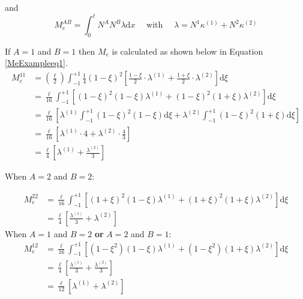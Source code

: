and
\begin{equation}
M_e^{AB} = \int_0^\ell N^A N^B \lambda \text{d}x \quad\text{ with }\quad \lambda = N^1 \kappa^{(1)} + N^2 \kappa^{(2)}
\end{equation}

If $A=1$ and $B=1$ then $M_e$ is calculated as shown below in Equation \ref{MeExampleeq1}.
\begin{equation} %
\begin{aligned}
M_e^{11} &= \left(\frac{\ell}{2}\right) \int_{-1}^{+1} \frac{1}{4} (1-\xi)^2\left[ \frac{1-\xi}{2} \cdot \lambda^{(1)} + \frac{1+\xi}{2} \cdot \lambda^{(2)} \right] \text{d} \xi \\
&= \frac{\ell}{16} \int_{-1}^{+1} \left[
	(1-\xi)^2(1-\xi) \lambda^{(1)}
	+ (1-\xi)^2(1+\xi) \lambda^{(2)}
\right] \text{d}\xi \\
&= \frac{\ell}{16} \left[
	\lambda^{(1)} \int_{-1}^{+1} (1-\xi)^2(1-\xi) \text{d}\xi
	+ \lambda^{(2)} \int_{-1}^{+1} (1-\xi)^2(1+\xi) \text{d}\xi
\right] \\
&= \frac{\ell}{16} \left[
	\lambda^{(1)} \cdot 4
	+ \lambda^{(2)} \cdot \frac{4}{3}
\right] \\
&= \frac{\ell}{4} \left[
	\lambda^{(1)} + \frac{\lambda^{(2)}}{3}
\right]
\end{aligned}
\end{equation}
 
 When $A=2$ and $B=2$:

\begin{equation}%
\begin{aligned}
M_e^{22} &= \frac{\ell}{16} \int_{-1}^{+1} \left[
	(1+\xi)^2(1-\xi)\lambda^{(1)} + (1+\xi)^2(1+\xi)\lambda^{(2)}
\right] \text{d}\xi \\
&= \frac{\ell}{4} \left[
	\frac{\lambda^{(1)}}{3}
	+ \lambda^{(2)}
\right]
\end{aligned}
\end{equation}
 When $A=1$ and $B=2$ \textbf{or} $A=2$ and $B=1$:
\begin{equation}%
\begin{aligned}
M_e^{12} &= \frac{\ell}{16} \int_{-1}^{+1} \left[
	(1-\xi^2)(1-\xi) \lambda^{(1)}
	+ (1-\xi^2)(1+\xi)\lambda^{(2)}
\right] \text{d} \xi \\
&= \frac{\ell}{4}\left[
	\frac{\lambda^{(1)}}{3}
	+ \frac{\lambda^{(2)}}{3}
\right] \\
&= \frac{\ell}{12}\left[
	\lambda^{(1)}
	+ \lambda^{(2)}
\right] \\
\end{aligned}
\end{equation}

